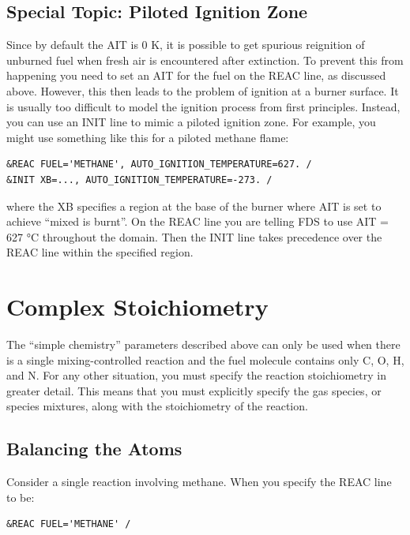 \documentclass[11pt]{book}
\begin{document}
\subsection{Special Topic: Piloted Ignition Zone}

\label{info:ignition}

Since by default the AIT is 0 K, it is possible to get spurious reignition of unburned fuel when fresh air is encountered after extinction.  To prevent this from happening you need to set an AIT for the fuel on the {\ct REAC} line, as discussed above.  However, this then leads to the problem of ignition at a burner surface.  It is usually too difficult to model the ignition process from first principles.  Instead, you can use an {\ct INIT} line to mimic a piloted ignition zone. For example, you might use something like this for a piloted methane flame:
\begin{lstlisting}
&REAC FUEL='METHANE', AUTO_IGNITION_TEMPERATURE=627. /
&INIT XB=..., AUTO_IGNITION_TEMPERATURE=-273. /
\end{lstlisting}
where the {\ct XB} specifies a region at the base of the burner where AIT is set to achieve ``mixed is burnt''.  On the {\ct REAC} line you are telling FDS to use AIT = 627 \si{\degreeCelsius} throughout the domain.  Then the {\ct INIT} line takes precedence over the {\ct REAC} line within the specified region.


\newpage

\section{Complex Stoichiometry}
\label{info:REAC_Diagnostics}

The ``simple chemistry'' parameters described above can only be used when there is a single mixing-controlled reaction and the fuel molecule contains only C, O, H, and N.
For any other situation, you must specify the reaction stoichiometry in greater detail. This means that you must explicitly specify the gas species, or species mixtures, along with
the stoichiometry of the reaction.

\subsection{Balancing the Atoms}

Consider a single reaction involving methane. When you specify the {\ct REAC} line to be:

\begin{lstlisting}
&REAC FUEL='METHANE' /
\end{lstlisting}
\end{document}
